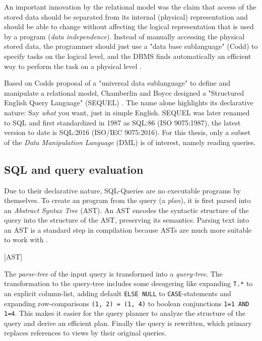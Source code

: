 An important innovation by the relational model was the claim that access of the stored data should be separated from its internal (physical) representation and should be able to change without affecting the logical representation that is used by a program (\textit{data independence}). Instead of manually accessing the physical stored data, the programmer should just use a "data base sublanguage" (Codd) to specify tasks on the logical level, and the DBMS finds automatically an efficient way to perform the task on a physical level \cite[p. 3 ff.]{FoD}.

Based on Codds proposal of a "universal data sublanguage" to define and manipulate a relational model, Chamberlin and Boyce designed a "Structured English Query Language" (SEQUEL) \cite{sequel, sequel2}. The name alone highlights its declarative nature: Say \textit{what} you want, just in simple English. SEQUEL was later renamed to SQL and first standardized in 1987 as SQL:86 (ISO 9075:1987), the latest version to date is SQL:2016 (ISO/IEC 9075:2016). For this thesis, only a subset of the \textit{Data Manipulation Language} (DML) is of interest, namely reading queries.

\subsection{SQL and query evaluation}

Due to their declarative nature, SQL-Queries are no executable programs by themselves. To create an program from the query (a \textit{plan}), it is first parsed into an \textit{Abstract Syntax Tree} (AST). An AST encodes the syntactic structure of the query into the structure of the AST, preserving its semantics. Parsing text into an AST is a standard step in compilation because ASTs are much more suitable to work with \cite[p. 5]{dragenbook}.

[AST]

The \textit{parse-tree} of the input query is transformed into a \textit{query-tree}. The transformation to the query-tree includes some desugering like expanding \texttt{T.*} to an explicit column-list, adding default \texttt{ELSE NULL} to \texttt{CASE}-statements and expanding row-comparisons \texttt{(1, 2) = (1, 4)} to boolean conjunctions \texttt{1=1 AND 1=4}. This makes it easier for the query planner to analyze the structure of the query and derive an efficient plan. Finally the query is rewritten, which primary replaces references to views by their original queries.

